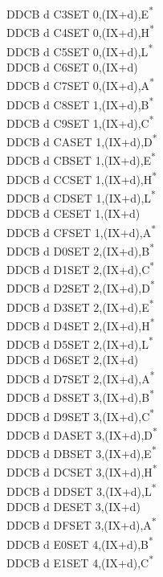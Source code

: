 \documentclass[twoside,openright,a4paper]{book}
\begin{document}
\begin{multicols}{3}
{\begin{tabbing}
	DDCB d C3\>SET 0,(IX+d),E\textsuperscript{*}\\
	DDCB d C4\>SET 0,(IX+d),H\textsuperscript{*}\\
	DDCB d C5\>SET 0,(IX+d),L\textsuperscript{*}\\
	DDCB d C6\>SET 0,(IX+d)\\
	DDCB d C7\>SET 0,(IX+d),A\textsuperscript{*}\\
	DDCB d C8\>SET 1,(IX+d),B\textsuperscript{*}\\
	DDCB d C9\>SET 1,(IX+d),C\textsuperscript{*}\\
	DDCB d CA\>SET 1,(IX+d),D\textsuperscript{*}\\
	DDCB d CB\>SET 1,(IX+d),E\textsuperscript{*}\\
	DDCB d CC\>SET 1,(IX+d),H\textsuperscript{*}\\
	DDCB d CD\>SET 1,(IX+d),L\textsuperscript{*}\\
	DDCB d CE\>SET 1,(IX+d)\\
	DDCB d CF\>SET 1,(IX+d),A\textsuperscript{*}\\
	DDCB d D0\>SET 2,(IX+d),B\textsuperscript{*}\\
	DDCB d D1\>SET 2,(IX+d),C\textsuperscript{*}\\
	DDCB d D2\>SET 2,(IX+d),D\textsuperscript{*}\\
	DDCB d D3\>SET 2,(IX+d),E\textsuperscript{*}\\
	DDCB d D4\>SET 2,(IX+d),H\textsuperscript{*}\\
	DDCB d D5\>SET 2,(IX+d),L\textsuperscript{*}\\
	DDCB d D6\>SET 2,(IX+d)\\
	DDCB d D7\>SET 2,(IX+d),A\textsuperscript{*}\\
	DDCB d D8\>SET 3,(IX+d),B\textsuperscript{*}\\
	DDCB d D9\>SET 3,(IX+d),C\textsuperscript{*}\\
	DDCB d DA\>SET 3,(IX+d),D\textsuperscript{*}\\
	DDCB d DB\>SET 3,(IX+d),E\textsuperscript{*}\\
	DDCB d DC\>SET 3,(IX+d),H\textsuperscript{*}\\
	DDCB d DD\>SET 3,(IX+d),L\textsuperscript{*}\\
	DDCB d DE\>SET 3,(IX+d)\\
	DDCB d DF\>SET 3,(IX+d),A\textsuperscript{*}\\
	DDCB d E0\>SET 4,(IX+d),B\textsuperscript{*}\\
	DDCB d E1\>SET 4,(IX+d),C\textsuperscript{*}\\

\end{tabbing}}
\end{multicols}
\end{document}
